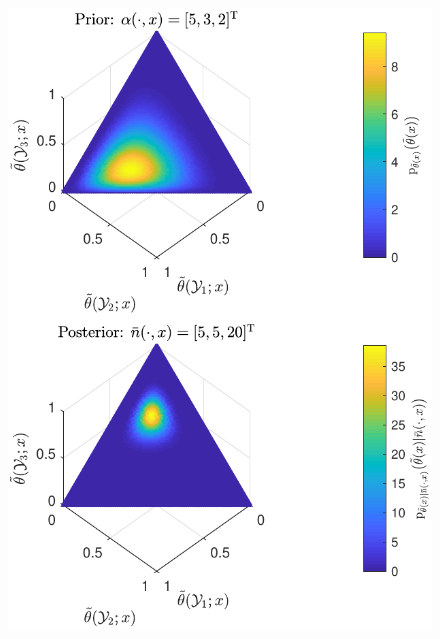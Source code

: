 \documentclass[aspectratio=169,usenames,dvipsnames]{beamer}
\begin{document}
\begin{frame}
\begin{columns}[T]
\hspace{3ex}
\begin{column}{.45\linewidth}
\vspace{-1.5em}
\begin{figure}
\centering
\includegraphics[width=0.8\linewidth]{P_theta_post_tilde.pdf}
\end{figure}

\end{column}

\end{columns}

\end{frame}
\end{document}
